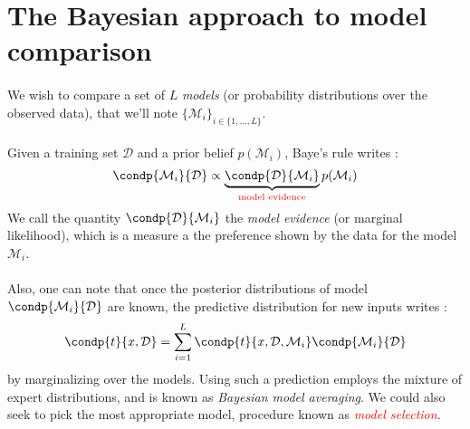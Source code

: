 \documentclass[a4paper]{article}
\begin{document}
			
	\vspace{10pt}
	
	\section{The Bayesian approach to model comparison}
	{
		\paragraph{} We wish to compare a set of $L$ \emph{models} (or probability distributions over the observed data), that we'll note $\{\mathcal{M}_i\}_{i\in\{1,\hdots, L\}}$. 
		
		\paragraph{} Given a training set $\mathcal{D}$ and a prior belief $p(\mathcal{M}_i)$, Baye's rule writes : 
		\begin{equation}
			\condp{\mathcal{M}_i}{\mathcal{D}} \propto \underbrace{\condp{\mathcal{D}}{\mathcal{M}_i}}_{\text{\textcolor{red}{model evidence}}}p(\mathcal{M}_i)
		\end{equation}
		We call the quantity $\condp{\mathcal{D}}{\mathcal{M}_i}$ the \emph{model evidence} (or marginal likelihood), which is a measure a the preference shown by the data for the model $\mathcal{M}_i$.
		
		\paragraph{} Also, one can note that once the posterior distributions of model $\condp{\mathcal{M}_i}{\mathcal{D}}$ are known, the predictive distribution for new inputs writes : 
		\begin{equation}
			\condp{t}{x,\mathcal{D}} = \sum_{i=1}^L \condp{t}{x,\mathcal{D},\mathcal{M}_i}\condp{\mathcal{M}_i}{\mathcal{D}}
		\end{equation}
		by marginalizing over the models. Using such a prediction employs the mixture of expert distributions, and is known as \emph{Bayesian model averaging}. We could also seek to pick the most appropriate model, procedure known as \emph{\textcolor{red}{model selection}}. 
	}	
	
\end{document}
